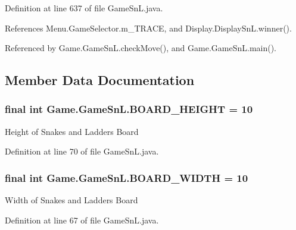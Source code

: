 Definition at line 637 of file Game\+Sn\+L.\+java.



References Menu.\+Game\+Selector.\+m\+\_\+\+T\+R\+A\+C\+E, and Display.\+Display\+Sn\+L.\+winner().



Referenced by Game.\+Game\+Sn\+L.\+check\+Move(), and Game.\+Game\+Sn\+L.\+main().



\subsection{Member Data Documentation}
\hypertarget{class_game_1_1_game_sn_l_a1fe9384816bed631e283ad665da87b25}{}
\subsubsection[{B\+O\+A\+R\+D\+\_\+\+H\+E\+I\+G\+H\+T}]{\setlength{\rightskip}{0pt plus 5cm}final int Game.\+Game\+Sn\+L.\+B\+O\+A\+R\+D\+\_\+\+H\+E\+I\+G\+H\+T = 10\hspace{0.3cm}{\ttfamily [private]}}\label{class_game_1_1_game_sn_l_a1fe9384816bed631e283ad665da87b25}
Height of Snakes and Ladders Board 

Definition at line 70 of file Game\+Sn\+L.\+java.

\hypertarget{class_game_1_1_game_sn_l_ad8871bbe0cb946186f76093b958380b2}{}
\subsubsection[{B\+O\+A\+R\+D\+\_\+\+W\+I\+D\+T\+H}]{\setlength{\rightskip}{0pt plus 5cm}final int Game.\+Game\+Sn\+L.\+B\+O\+A\+R\+D\+\_\+\+W\+I\+D\+T\+H = 10\hspace{0.3cm}{\ttfamily [private]}}\label{class_game_1_1_game_sn_l_ad8871bbe0cb946186f76093b958380b2}
Width of Snakes and Ladders Board 

Definition at line 67 of file Game\+Sn\+L.\+java.


